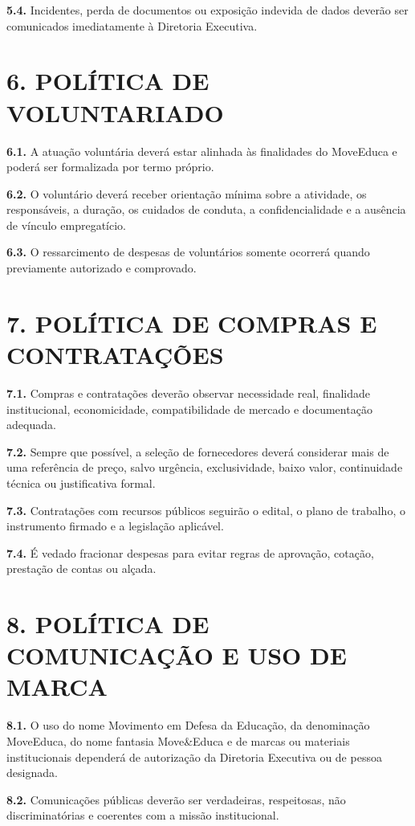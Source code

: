 \documentclass[11pt,a4paper]{article}
\begin{document}
\textbf{5.4.} Incidentes, perda de documentos ou exposição indevida de dados deverão ser comunicados imediatamente à Diretoria Executiva.

\section*{6. POLÍTICA DE VOLUNTARIADO}

\textbf{6.1.} A atuação voluntária deverá estar alinhada às finalidades do MoveEduca e poderá ser formalizada por termo próprio.

\textbf{6.2.} O voluntário deverá receber orientação mínima sobre a atividade, os responsáveis, a duração, os cuidados de conduta, a confidencialidade e a ausência de vínculo empregatício.

\textbf{6.3.} O ressarcimento de despesas de voluntários somente ocorrerá quando previamente autorizado e comprovado.

\section*{7. POLÍTICA DE COMPRAS E CONTRATAÇÕES}

\textbf{7.1.} Compras e contratações deverão observar necessidade real, finalidade institucional, economicidade, compatibilidade de mercado e documentação adequada.

\textbf{7.2.} Sempre que possível, a seleção de fornecedores deverá considerar mais de uma referência de preço, salvo urgência, exclusividade, baixo valor, continuidade técnica ou justificativa formal.

\textbf{7.3.} Contratações com recursos públicos seguirão o edital, o plano de trabalho, o instrumento firmado e a legislação aplicável.

\textbf{7.4.} É vedado fracionar despesas para evitar regras de aprovação, cotação, prestação de contas ou alçada.

\section*{8. POLÍTICA DE COMUNICAÇÃO E USO DE MARCA}

\textbf{8.1.} O uso do nome Movimento em Defesa da Educação, da denominação MoveEduca, do nome fantasia Move\&Educa e de marcas ou materiais institucionais dependerá de autorização da Diretoria Executiva ou de pessoa designada.

\textbf{8.2.} Comunicações públicas deverão ser verdadeiras, respeitosas, não discriminatórias e coerentes com a missão institucional.
\end{document}
